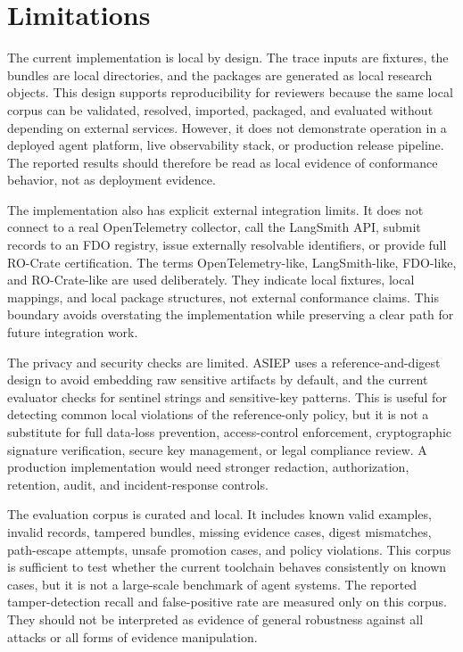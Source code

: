 \section{Limitations}

The current implementation is local by design. The trace inputs are fixtures, the bundles are local directories, and the packages are generated as local research objects. This design supports reproducibility for reviewers because the same local corpus can be validated, resolved, imported, packaged, and evaluated without depending on external services. However, it does not demonstrate operation in a deployed agent platform, live observability stack, or production release pipeline. The reported results should therefore be read as local evidence of conformance behavior, not as deployment evidence.

The implementation also has explicit external integration limits. It does not connect to a real OpenTelemetry collector, call the LangSmith API, submit records to an FDO registry, issue externally resolvable identifiers, or provide full RO-Crate certification. The terms OpenTelemetry-like, LangSmith-like, FDO-like, and RO-Crate-like are used deliberately. They indicate local fixtures, local mappings, and local package structures, not external conformance claims. This boundary avoids overstating the implementation while preserving a clear path for future integration work.

The privacy and security checks are limited. ASIEP uses a reference-and-digest design to avoid embedding raw sensitive artifacts by default, and the current evaluator checks for sentinel strings and sensitive-key patterns. This is useful for detecting common local violations of the reference-only policy, but it is not a substitute for full data-loss prevention, access-control enforcement, cryptographic signature verification, secure key management, or legal compliance review. A production implementation would need stronger redaction, authorization, retention, audit, and incident-response controls.

The evaluation corpus is curated and local. It includes known valid examples, invalid records, tampered bundles, missing evidence cases, digest mismatches, path-escape attempts, unsafe promotion cases, and policy violations. This corpus is sufficient to test whether the current toolchain behaves consistently on known cases, but it is not a large-scale benchmark of agent systems. The reported tamper-detection recall and false-positive rate are measured only on this corpus. They should not be interpreted as evidence of general robustness against all attacks or all forms of evidence manipulation.


